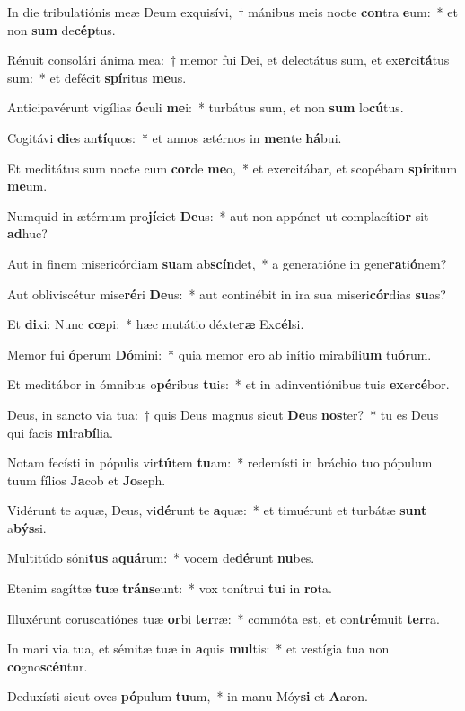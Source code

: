 \item In die tribulatiónis meæ Deum exquisívi,~† mánibus meis nocte \textbf{con}tra \textbf{e}um:~* et non \textbf{sum} de\textbf{cép}tus.
\item Rénuit consolári ánima mea:~† memor fui Dei, et delectátus sum, et ex\textbf{er}ci\textbf{tá}tus sum:~* et defécit \textbf{spí}ritus \textbf{me}us.
\item Anticipavérunt vigílias \textbf{ó}culi \textbf{me}i:~* turbátus sum, et non \textbf{sum} lo\textbf{cú}tus.
\item Cogitávi \textbf{di}es an\textbf{tí}quos:~* et annos ætérnos in \textbf{men}te \textbf{há}bui.
\item Et meditátus sum nocte cum \textbf{cor}de \textbf{me}o,~* et exercitábar, et scopébam \textbf{spí}ritum \textbf{me}um.
\item Numquid in ætérnum pro\textbf{jí}ciet \textbf{De}us:~* aut non appónet ut complacíti\textbf{or} sit \textbf{ad}huc?
\item Aut in finem misericórdiam \textbf{su}am ab\textbf{scín}det,~* a generatióne in gene\textbf{ra}ti\textbf{ó}nem?
\item Aut obliviscétur mise\textbf{ré}ri \textbf{De}us:~* aut continébit in ira sua miseri\textbf{cór}dias \textbf{su}as?
\item Et \textbf{di}xi: Nunc \textbf{cœ}pi:~* hæc mutátio déxte\textbf{ræ} Ex\textbf{cél}si.
\item Memor fui \textbf{ó}perum \textbf{Dó}mini:~* quia memor ero ab inítio mirabíli\textbf{um} tu\textbf{ó}rum.
\item Et meditábor in ómnibus o\textbf{pé}ribus \textbf{tu}is:~* et in adinventiónibus tuis \textbf{ex}er\textbf{cé}bor.
\item Deus, in sancto via tua:~† quis Deus magnus sicut \textbf{De}us \textbf{nos}ter?~* tu es Deus qui facis \textbf{mi}ra\textbf{bí}lia.
\item Notam fecísti in pópulis vir\textbf{tú}tem \textbf{tu}am:~* redemísti in bráchio tuo pópulum tuum fílios \textbf{Ja}cob et \textbf{Jo}seph.
\item Vidérunt te aquæ, Deus, vi\textbf{dé}runt te \textbf{a}quæ:~* et timuérunt et turbátæ \textbf{sunt} a\textbf{býs}si.
\item Multitúdo sóni\textbf{tus} a\textbf{quá}rum:~* vocem de\textbf{dé}runt \textbf{nu}bes.
\item Etenim sagíttæ \textbf{tu}æ \textbf{tráns}eunt:~* vox tonítrui \textbf{tu}i in \textbf{ro}ta.
\item Illuxérunt coruscatiónes tuæ \textbf{or}bi \textbf{ter}ræ:~* commóta est, et con\textbf{tré}muit \textbf{ter}ra.
\item In mari via tua, et sémitæ tuæ in \textbf{a}quis \textbf{mul}tis:~* et vestígia tua non \textbf{co}gno\textbf{scén}tur.
\item Deduxísti sicut oves \textbf{pó}pulum \textbf{tu}um,~* in manu Móy\textbf{si} et \textbf{A}aron.
